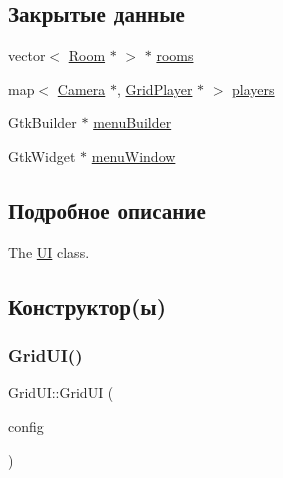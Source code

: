 \subsection*{Закрытые данные}
\begin{DoxyCompactItemize}
\item 
vector$<$ \hyperlink{class_room}{Room} $\ast$ $>$ $\ast$ \hyperlink{class_grid_u_i_ad23d09850beb8360fbeaaa434a38abb6}{rooms}
\item 
map$<$ \hyperlink{struct_camera}{Camera} $\ast$, \hyperlink{class_grid_player}{Grid\+Player} $\ast$ $>$ \hyperlink{class_grid_u_i_ad3e2be4552ccd81a5343687c10eae3f2}{players}
\item 
Gtk\+Builder $\ast$ \hyperlink{class_grid_u_i_a1bea8d64764771e939fd8732648e111b}{menu\+Builder}
\item 
Gtk\+Widget $\ast$ \hyperlink{class_grid_u_i_a26d32f32c581df9a247a730780a7ea73}{menu\+Window}
\end{DoxyCompactItemize}


\subsection{Подробное описание}
The \hyperlink{class_u_i}{UI} class. 

\subsection{Конструктор(ы)}
\mbox{\label{class_grid_u_i_a3fb2c00058a899778812018dea387e24}} 
\subsubsection{\texorpdfstring{Grid\+U\+I()}{GridUI()}}
{\footnotesize\ttfamily Grid\+U\+I\+::\+Grid\+UI (\begin{DoxyParamCaption}\item[{\hyperlink{class_grid_config}{Grid\+Config} $\ast$}]{config }\end{DoxyParamCaption})}

